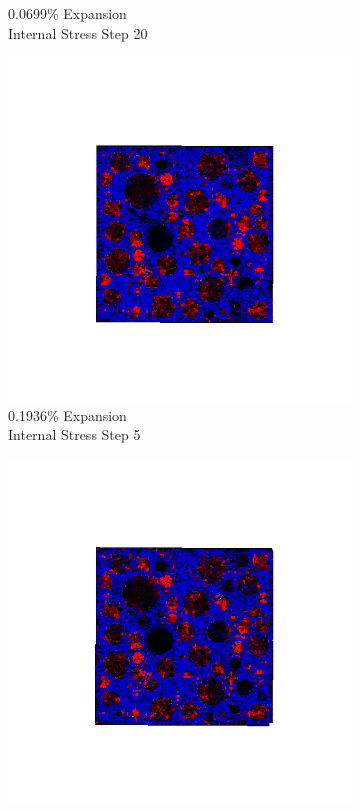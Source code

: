 \begin{figure}[ht!]
\begin{subfigure}{.25\textwidth}
      \caption{0.0699\% Expansion\\Internal Stress Step 20}
    \end{subfigure}
    \begin{subfigure}{.25\textwidth}
      \centering
      \includegraphics[width=1.0\linewidth]{Files/exp_3D/ASR/A30P75_2_s5.png}
      \caption{0.1936\% Expansion\\Internal Stress Step 5}
    \end{subfigure}%
    \begin{subfigure}{.25\textwidth}
      \centering
      \includegraphics[width=1.0\linewidth]{Files/exp_3D/ASR/A30P75_2_s10.png}

\end{subfigure}
\end{figure}
